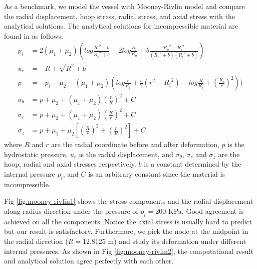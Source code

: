 As a benchmark, we model the vessel with Mooney-Rivlin model and compare the radial displacement, hoop stress, radial stress, and axial stress with the analytical solutions. The analytical solutions for incompressible material are found in \cite{Green} as follows: 
\begin{subequations}
\begin{align}
p_i &= 2(\mu_1 + \mu_2)(log\frac{{R_i}^2 + b}{{R_o}^2 + b} - 2log\frac{R_i}{R_o} +
b\frac{{R_o}^2 - {R_i}^2}{({R_o}^2+b)({R_i}^2+b)}) \\
u_r &= -R + \sqrt{R^2 + b} \\
p &= - p_i - \mu_2 - (\mu_1 + \mu_2)(log\frac{r}{R_i} + \frac{b}{2}(r^2 - {R_i}^2) - log\frac{R}{R_i} + {(\frac{R_i}{r})}^2) ) \\
\sigma_{\theta} &= p + \mu_2 + (\mu_1 + \mu_2)(\frac{r}{R})^2 + C \\
\sigma_r &= p + \mu_2 + (\mu_1 + \mu_2)(\frac{R}{r})^2 + C \\
\sigma_z &= p +  \mu_1 + \mu_2[(\frac{R}{r})^2 + (\frac{r}{R})^2] + C
\end{align}
\end{subequations}
where $R$ and $r$ are the radial coordinate before and after deformation, $p$ is the hydrostatic pressure, $u_r$ is the radial displacement, and $\sigma_{\theta}$, $\sigma_r$ and $\sigma_z$ are the hoop, radial and axial stresses respectively. $b$ is a constant determined by the internal pressure $p_i$, and $C$ is an arbitrary constant since the material is incompressible. 

Fig \ref{fig:mooney-rivlin1} shows the stress components and the radial displacement along radius direction under the pressure of $p_i = 200$ KPa. Good agreement is achieved on all the components. Notice the axial stress is usually hard to predict but our result is satisfactory. Furthermore, we pick the node at the midpoint in the radial direction ($R = 12.8125$ m) and study its deformation under different internal pressures. As shown in Fig \ref{fig:mooney-rivlin2}, the computational result and analytical solution agree perfectly with each other. 


